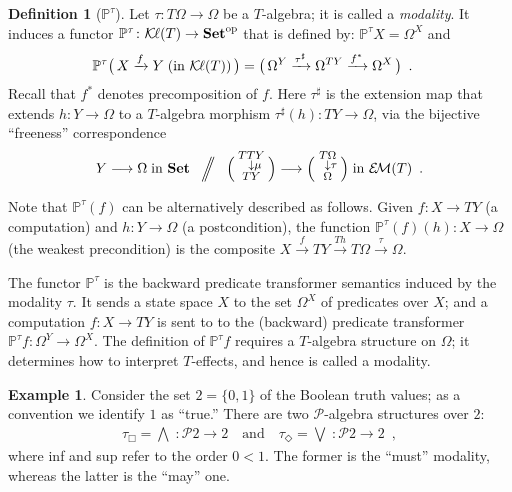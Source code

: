 \documentclass[9pt, preprint]{sigplanconf}
\theoremstyle{theorem}
\theoremstyle{definition}
\newtheorem{definition}[theorem]{Definition}
\newtheorem{example}[theorem]{Example}
\newcommand{\xxto}{\xrightarrow}
\newcommand{\pow}{\mathcal{P}}
\newcommand{\op}{\mathrm{op}}
\newcommand{\Set}{\mathbf{Set}}
\newcommand{\Sets}{\Set}
\newcommand{\EM}{\mathcal{E}{\kern-.5ex}\mathcal{M}}
\newcommand{\Kl}{\mathcal{K}{\kern-.2ex}\ell}
\newcommand{\bbP}{\mathbb{P}}
\newcommand{\valg}[3]{\raisebox{.00in}
{\mbox{\large ${{{\scriptstyle #1}\atop
{\phantom{\scriptstyle #2}}\scriptstyle\downarrow #2}
\atop{\scriptstyle #3}}$}}}
\begin{document}
\begin{definition}[$\bbP^{\tau}$]
  \label{def:pt-semantics-in-set}
Let  $\tau \colon T {\Omega} \to \Omega$
be a $T$-algebra; it is called  a \emph{modality}. It induces
  a functor $\bbP^{\tau} \colon \Kl(T) \to \Set^{\op}$ that is defined
 by:
 $  \bbP^{\tau} X = \Omega^X$ and
 \begin{align*}
\bbP^{\tau}\bigl(\,X \xxto{f} Y \text{\;(in $\Kl(T)$)}\,\bigr) &=
\bigl(\,\Omega^Y \xxto{\tau^{\sharp}}
  \Omega^{TY} \xxto{f^*} \Omega^X
\,\bigr)\enspace.
 \end{align*}
  Recall that $f^{*}$ denotes precomposition of $f$.
  Here $\tau^{\sharp}$ is the extension map
  that extends $h \colon Y \to \Omega$ to
  a $T$-algebra morphism $\tau^{\sharp}(h) \colon TY \to \Omega$,  via the
 bijective ``freeness'' correspondence
  \begin{align*}
     Y\longrightarrow \Omega \;\text{in $\Sets$}\quad\Bigl/\!\!\!\!\!\!\Bigr/\quad
     \Bigl(\valg{TTY}{\mu}{TY}\Bigr)
     \longrightarrow
     \Bigl(\valg{T\Omega}{\tau}{\Omega} \Bigr) \;\text{in $\EM(T)$}\enspace.
  \end{align*}



  Note that $\bbP^{\tau}(f)$ can be alternatively described as follows.
  Given $f\colon X\to TY$ (a computation) and $h\colon Y\to \Omega$ (a postcondition), the function
 $\bbP^{\tau}(f)(h)\colon X\to \Omega$ (the weakest precondition) is the composite
  \begin{math}
  X\xrightarrow{f}TY\xrightarrow{Th}T\Omega\xrightarrow{\tau}\Omega
  \end{math}.
\end{definition}

The functor $\bbP^{\tau}$ is the backward predicate transformer
semantics
induced by the modality $\tau$. It sends a state space $X$ to
the set $\Omega^X$ of predicates over $X$;
and a computation $f \colon X \to TY$ is sent to
to the (backward) predicate transformer
$\bbP^{\tau}f \colon {\Omega}^Y \to {\Omega}^X$.
The definition of $\bbP^{\tau}f$ requires a $T$-algebra
structure on $\Omega$; it determines how to interpret $T$-effects, and
hence is called a modality.

\begin{example}\label{ex:modalityAndPredTrans}
 Consider the set $2=\{0,1\}$ of the Boolean truth values; as a
 convention we identify $1$ as ``true.'' There are two
 $\pow$-algebra structures over $2$:
 \begin{align*}
  \tau_{\Box}=\bigwedge\;\colon \pow 2\to 2
  \quad\text{and}\quad
  \tau_{\Diamond}=\bigvee\;\colon \pow 2\to 2\enspace,
 \end{align*}
 where inf and sup refer to the order $0<1$. The former is
 the ``must'' modality, whereas the latter is the ``may'' one.
\end{example}
\end{document}
